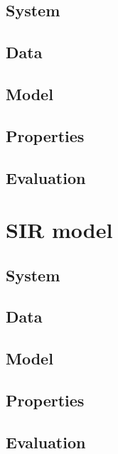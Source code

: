 \subsection{System}
\subsection{Data}
\subsection{Model}
\subsection{Properties}
\subsection{Evaluation}


\section{SIR model}
\subsection{System}
\subsection{Data}
\subsection{Model}
\subsection{Properties}
\subsection{Evaluation}

